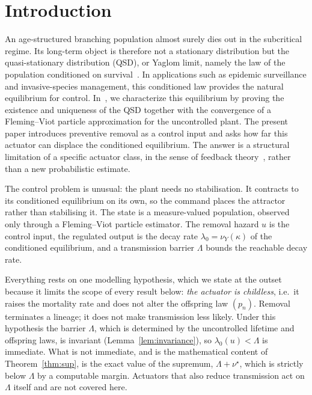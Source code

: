 \documentclass[letterpaper, 10pt, conference]{ieeeconf}
\newcommand{\Lbar}{\Lambda}
\newcommand{\rev}[1]{#1}
\newcommand{\pl}[1]{#1}
\newcommand{\ed}[1]{#1}
\begin{document}
\section{Introduction}
An age-structured branching population almost surely dies out in the subcritical regime. Its long-term object is therefore not a stationary distribution but the quasi-stationary distribution (QSD), or Yaglom limit, namely the law of
the population conditioned on survival~\cite{bellman,athreya,tran,yaglom,meleard}. In applications such as epidemic surveillance and invasive-species management, this conditioned law provides the natural equilibrium for control.
In~\cite{companion}, we characterize this equilibrium by proving the existence and uniqueness of the QSD together with the convergence of a Fleming--Viot particle approximation for the uncontrolled plant. \rev{The present paper introduces
preventive removal as a control input and asks how far this actuator can displace
the conditioned equilibrium. The answer is a structural limitation of a specific
actuator class, in the sense of feedback theory~\cite{sbg,freudenberg,stein},
rather than a new probabilistic estimate.}

\rev{The control problem is unusual: \pl{the plant needs no stabilisation}.} It contracts to its conditioned
equilibrium on its own, so the command places the attractor rather than stabilising it. The state is a measure-valued population, observed only through a Fleming--Viot particle estimator. The removal hazard $u$ is the
control input, the regulated output is the decay rate $\lambda_0=\nu_Y(\kappa)$ of the conditioned equilibrium, and a transmission barrier $\Lbar$ bounds the reachable decay rate.

\rev{Everything rests on one modelling hypothesis, which we state at the outset
because it \pl{limits} the scope of every result below: \emph{the actuator is
childless}, i.e.\ it raises the mortality rate and does not alter the offspring
law $(p_n)$. Removal terminates a lineage; it does not make transmission less
likely. Under this hypothesis the barrier $\Lbar$, which is determined by the
uncontrolled lifetime and offspring laws, is invariant (Lemma~\ref{lem:invariance}), so
$\lambda_0(u)<\Lbar$ is immediate. What is \pl{not} immediate\ed{, and is the
mathematical content of Theorem~\ref{thm:sup},} is the exact value of the
supremum, $\Lbar+\nu^\star$, which is strictly below $\Lbar$ by a computable
margin. \pl{Actuators that also reduce transmission act on $\Lbar$ itself and
are not covered here.}}
\end{document}
